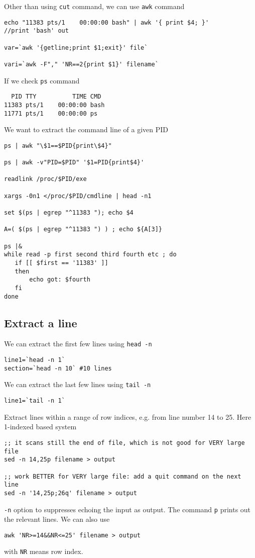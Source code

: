 Other than using \verb!cut! command, we can use \verb!awk! command
\begin{verbatim}
echo "11383 pts/1    00:00:00 bash" | awk '{ print $4; }'
//print 'bash' out

var=`awk '{getline;print $1;exit}' file`

vari=`awk -F"," 'NR==2{print $1}' filename` 
\end{verbatim}

If we check \verb!ps! command
\begin{verbatim}
  PID TTY          TIME CMD
11383 pts/1    00:00:00 bash
11771 pts/1    00:00:00 ps
\end{verbatim}

We want to extract the command line of a given PID
\begin{verbatim}
ps | awk "\$1==$PID{print\$4}"

ps | awk -v"PID=$PID" '$1=PID{print$4}'

readlink /proc/$PID/exe

xargs -0n1 </proc/$PID/cmdline | head -n1

set $(ps | egrep "^11383 "); echo $4

A=( $(ps | egrep "^11383 ") ) ; echo ${A[3]}

ps |&
while read -p first second third fourth etc ; do
   if [[ $first == '11383' ]]
   then
       echo got: $fourth
   fi       
done
\end{verbatim}

\subsection{Extract a line}
\label{sec:extract_line}

We can extract the first few lines using \verb!head -n!

\begin{verbatim}
line1=`head -n 1`
section=`head -n 10` #10 lines
\end{verbatim}

We can extract the last few lines using \verb!tail -n!

\begin{verbatim}
line1=`tail -n 1`
\end{verbatim}

Extract lines within a range of row indices, e.g. from line number 14 to 25.
Here 1-indexed based system
\begin{verbatim}
;; it scans still the end of file, which is not good for VERY large file
sed -n 14,25p filename > output

;; work BETTER for VERY large file: add a quit command on the next line
sed -n '14,25p;26q' filename > output
\end{verbatim}
\verb!-n! option to suppresses echoing the input as output. The command \verb!p!
prints out the relevant lines. We can also use
\begin{verbatim}
awk 'NR>=14&&NR<=25' filename > output
\end{verbatim}
with \verb!NR! means row index.

